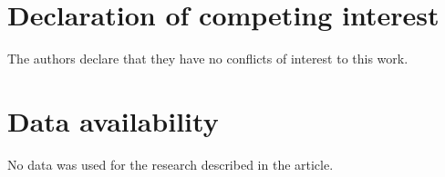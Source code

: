 \documentclass[11pt,a4paper]{article}
\theoremstyle{plain}
\theoremstyle{definition}
\begin{document}

\section*{Declaration of competing interest}
The authors declare that they have no conflicts of interest to this work.


\section*{Data availability}
No data was used for the research described in the article.

\end{document}
